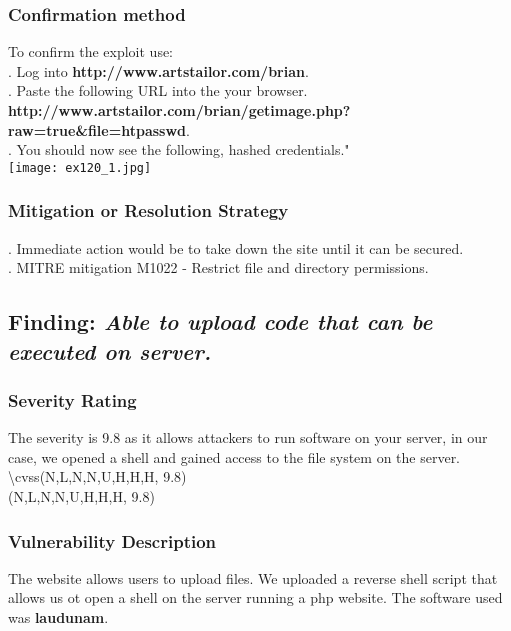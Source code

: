 \documentclass[notitlepage]{article}
\begin{document}
	\subsubsection{Confirmation method}
	To confirm the exploit use: \\
	. Log into \textbf{http://www.artstailor.com/brian}.  \\
	. Paste the following URL into the your browser. \textbf{http://www.artstailor.com/brian/getimage.php?raw=true\&file=htpasswd}.\\  
	. You should now see the following, hashed credentials." \\
	\texttt{[image: ex120\_1.jpg]} \\
	
	\subsubsection{Mitigation or Resolution Strategy}
	. Immediate action would be to take down the site until it can be secured. \\
	. MITRE mitigation M1022 - Restrict file and directory permissions. \\
	
	\subsection{Finding: \emph{Able to upload code that can be executed on server. }}
	
	\subsubsection{Severity Rating}
	\indent The severity is 9.8 as it allows attackers to run software on your server, in our case, we opened a shell and gained access to the file system on the server.  \\
	
	\textbackslash cvss(N,L,N,N,U,H,H,H, 9.8)\\
	\cvss(N,L,N,N,U,H,H,H, 9.8) \\
	
	\subsubsection{Vulnerability Description}
	\indent The website allows users to upload files. We uploaded a reverse shell script that allows us ot open a shell on the server running a php website. The software used was \textbf{laudunam}. \\
	
\end{document}
